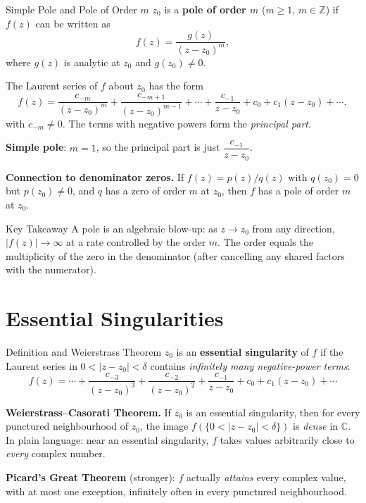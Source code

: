 \documentclass[12pt,a4paper]{article}
\begin{document}
\begin{infobox}{Simple Pole and Pole of Order $m$}
$z_0$ is a \textbf{pole of order $m$} ($m \geq 1$, $m \in \mathbb{Z}$) if $f(z)$ can be written as
\[
  f(z) = \frac{g(z)}{(z - z_0)^m},
\]
where $g(z)$ is analytic at $z_0$ and $g(z_0) \neq 0$.

The Laurent series of $f$ about $z_0$ has the form
\[
  f(z) = \frac{c_{-m}}{(z-z_0)^m} + \frac{c_{-m+1}}{(z-z_0)^{m-1}} + \cdots + \frac{c_{-1}}{z-z_0}
         + c_0 + c_1(z-z_0) + \cdots,
\]
with $c_{-m} \neq 0$. The terms with negative powers form the \emph{principal part}.

\textbf{Simple pole}: $m = 1$, so the principal part is just $\dfrac{c_{-1}}{z - z_0}$.

\textbf{Connection to denominator zeros.}
If $f(z) = p(z)/q(z)$ with $q(z_0) = 0$ but $p(z_0) \neq 0$, and $q$ has a zero of order $m$ at
$z_0$, then $f$ has a pole of order $m$ at $z_0$.
\end{infobox}

\begin{learnbox}{Key Takeaway}
A pole is an algebraic blow-up: as $z \to z_0$ from any direction, $|f(z)| \to \infty$ at a rate
controlled by the order $m$. The order equals the multiplicity of the zero in the denominator
(after cancelling any shared factors with the numerator).
\end{learnbox}

\section{Essential Singularities}

\begin{infobox}{Definition and Weierstrass Theorem}
$z_0$ is an \textbf{essential singularity} of $f$ if the Laurent series in $0 < |z-z_0|<\delta$
contains \emph{infinitely many negative-power terms}:
\[
  f(z) = \cdots + \frac{c_{-3}}{(z-z_0)^3} + \frac{c_{-2}}{(z-z_0)^2} + \frac{c_{-1}}{z-z_0}
         + c_0 + c_1(z-z_0) + \cdots
\]

\textbf{Weierstrass--Casorati Theorem.}
If $z_0$ is an essential singularity, then for every punctured neighbourhood of $z_0$, the image
$f\!\left(\{0<|z-z_0|<\delta\}\right)$ is \emph{dense} in $\mathbb{C}$. In plain language: near
an essential singularity, $f$ takes values arbitrarily close to \emph{every} complex number.

\textbf{Picard's Great Theorem} (stronger): $f$ actually \emph{attains} every complex value,
with at most one exception, infinitely often in every punctured neighbourhood.
\end{infobox}
\end{document}
